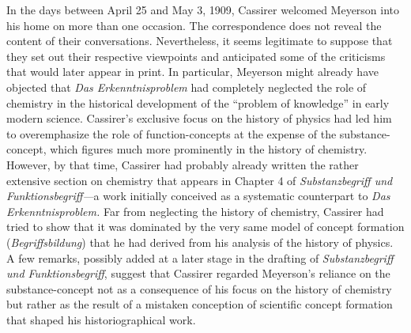 In the days between April 25 and May 3, 1909, Cassirer welcomed Meyerson into his home on more than one occasion. The correspondence does not reveal the content of their conversations. Nevertheless, it seems legitimate to suppose that they set out their respective viewpoints and anticipated some of the criticisms that would later appear in print. In particular, Meyerson might already have objected that \emph{Das Erkenntnisproblem} had completely neglected the role of chemistry in the historical development of the ``problem of knowledge'' in early modern science. Cassirer's exclusive focus on the history of physics had led him to overemphasize the role of function-concepts at the expense of the substance-concept, which figures much more prominently in the history of chemistry. However, by that time, Cassirer had probably already written the rather extensive section on chemistry that appears in Chapter 4 of \emph{Substanzbegriff und Funktionsbegriff---}a work initially conceived as a systematic counterpart to \emph{Das Erkenntnisproblem.} Far from neglecting the history of chemistry, Cassirer had tried to show that it was dominated by the very same model of concept formation (\emph{Begriffsbildung}) that he had derived from his analysis of the history of physics. A few remarks, possibly added at a later stage in the drafting of \emph{Substanzbegriff und Funktionsbegriff}, suggest that Cassirer regarded Meyerson's reliance on the substance-concept not as a consequence of his focus on the history of chemistry but rather as the result of a mistaken conception of scientific concept formation that shaped his historiographical work.
